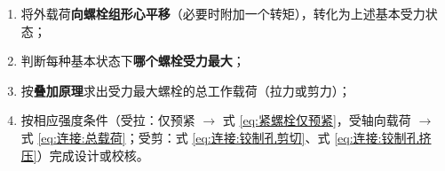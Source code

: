 \begin{keybox}[受力分析的通用步骤]
\begin{enumerate}
	\item 将外载荷\textbf{向螺栓组形心平移}（必要时附加一个转矩），转化为上述基本受力状态；
	\item 判断每种基本状态下\textbf{哪个螺栓受力最大}；
	\item 按\textbf{叠加原理}求出受力最大螺栓的总工作载荷（拉力或剪力）；
	\item 按相应强度条件（受拉：仅预紧 $\to$ 式 \eqref{eq:紧螺栓仅预紧}，受轴向载荷 $\to$ 式 \eqref{eq:连接:总载荷}；受剪：式 \eqref{eq:连接:铰制孔剪切}、式 \eqref{eq:连接:铰制孔挤压}）完成设计或校核。
\end{enumerate}
\end{keybox}

